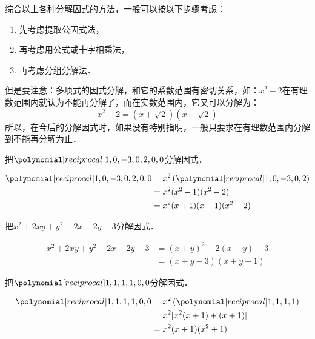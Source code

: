 综合以上各种分解因式的方法，一般可以按以下步骤考虑：
\begin{enumerate}
    \item 先考虑提取公因式法，
    \item 再考虑用公式或十字相乘法，
    \item 再考虑分组分解法．
\end{enumerate}

但是要注意：多项式的因式分解，和它的系数范围有密切关系，如：$x^2-2$在有理数范围内就认为不能再分解了，而在实数范围内，它又可以分解为：
\[x^2-2=(x+\sqrt{2})(x-\sqrt{2})\]
所以，在今后的分解因式时，如果没有特别指明，一般只要求在有理数范围内分解到不能再分解为止．

\begin{example}
    把$\poly{1,0,-3,0,2,0,0}$分解因式．
\end{example}

\begin{solution}
 \[\begin{split}
    \poly{1,0,-3,0,2,0,0}&=x^2\left(\poly{1,0,-3,0,2}\right)\\
    &=x^2(x^2-1)(x^2-2)\\
    &=x^2(x+1)(x-1)(x^2-2)    
 \end{split}\]   
\end{solution}


\begin{example}
    把$x^2+2xy+y^2-2x-2y-3$分解因式．
\end{example}

\begin{solution}
    \[\begin{split}
        x^2+2xy+y^2-2x-2y-3&=(x+y)^2 -2(x+y)-3\\
        &=(x+y-3)(x+y+1)    
    \end{split}\]
\end{solution}

\begin{example}
    把$\poly{1,1,1,1,0,0}$分解因式． 
\end{example}

\begin{solution}
    \[\begin{split}
        \poly{1,1,1,1,0,0}&=x^2\left(\poly{1,1,1,1}\right)\\
        &=x^2[x^2(x+1)+(x+1)]\\
        &=x^2(x+1)(x^2+1)       
    \end{split}\]
\end{solution}


